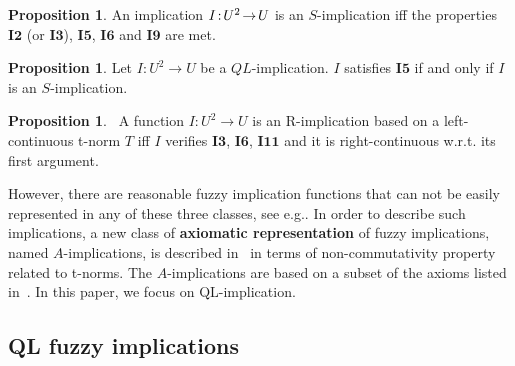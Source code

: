 \documentclass[12pt]{article}
\theoremstyle{plain}
\theoremstyle{remark}
\theoremstyle{definition}
\theoremstyle{proposition}
\newtheorem{proposition}[theorem]{Proposition}
\begin{document}
\begin{proposition}\cite[Theorem 1.13]{FR94}\label{pro-S-imp}
 An implication $I\hspace{-0.05cm}:\hspace{-0.05cm}U^2\hspace{-0.05cm}\rightarrow \hspace{-0.05cm}U$ is an \hspace{-0.05cm}$S$-implication
iff\hspace{-0.05cm} \hspace{-0.05cm} the properties $\mathbf{I2}$\hspace{-0.05cm} (\hspace{-0.05cm}or\hspace{-0.05cm} $\mathbf{I3}$),\hspace{-0.05cm} $\mathbf{I5}$,\hspace{-0.05cm} $\mathbf{I6}$\hspace{-0.05cm} and\hspace{-0.05cm} $\mathbf{I9}$ are met.
\end{proposition}



\begin{proposition}\cite[Theorem 2.6.19]{BJ08}\label{pro-QL-imp}
Let $I:U^2\rightarrow U$ be a $QL$-implication. $I$ satisfies
$\mathbf{I5}$ if and only if $I$ is an $S$-implication.
\end{proposition}


\begin{proposition}~\cite[Theorem 1.14]{FR94}\label{pro-R-imp}
A function $I:U^2\rightarrow U$ is an R-implication based on a  left-continuous t-norm $T$ iff
$I$ verifies $\mathbf{I3}$, $\mathbf{I6}$, $\mathbf{I11}$ and it is right-continuous w.r.t. its first argument.
\end{proposition}

However, there are reasonable fuzzy implication functions that can
not be easily represented in any of these three classes, see e.g.\cite{Yag04}. In order to describe such implications, a new class of \textbf{axiomatic representation} of fuzzy
implications, named
$A$-implications, is described in~\cite{TurKrei98} in
terms of non-commutativity property related to t-norms. The $A$-implications
are based on a subset of the axioms listed in~\cite{FR94}. In this paper, we focus on QL-implication.

\subsection{QL fuzzy implications}\label{subsec-5b}
\end{document}
